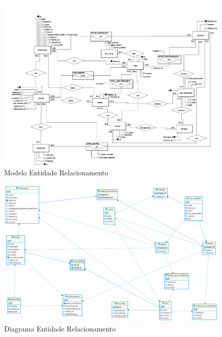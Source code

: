 \begin{PAGINA-A3}

\begin{figure}[p]
    \centering \includegraphics[height=\textheight,width=\textwidth,keepaspectratio]{imagens/ModeloConceitual.png}
	\caption{\label{mer-figura}Modelo Entidade Relacionamento}
\end{figure}

\end{PAGINA-A3}


\begin{PAGINA-A3}

\begin{figure}[p]
    \centering \includegraphics[height=\textheight,width=\textwidth,keepaspectratio]{imagens/der.jpg}
	\caption{\label{der-figura}Diagrama Entidade Relacionamento}
\end{figure}

\end{PAGINA-A3}

